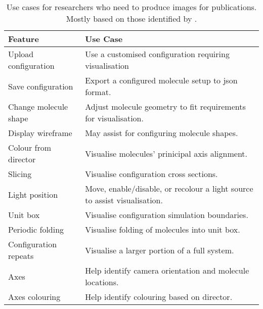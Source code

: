 \begin{table}
  \begin{center}
    \begin{adjustbox}{width=\textwidth}
    \begin{tabular}{ll}
    \hline\hline
       \textbf{Feature} & \textbf{Use Case} \\
       \hline
       Upload configuration & Use a customised configuration requiring visualisation \\
       Save configuration & Export a configured molecule setup to json format. \\
       Change molecule shape & Adjust molecule geometry to fit requirements for visualisation. \\
       Display wireframe & May assist for configuring molecule shapes. \\
       Colour from director & Visualise molecules' prinicipal axis alignment. \\
       Slicing & Visualise configuration cross sections. \\
       Light position & Move, enable/disable, or recolour a light source to assist visualisation.\\
       Unit box & Visualise configuration simulation boundaries. \\
       Periodic folding & Visualise folding of molecules into unit box. \\
       Configuration repeats & Visualise a larger portion of a full system. \\
       Axes & Help identify camera orientation and molecule locations. \\
       Axes colouring & Help identify colouring based on director. \\
       \hline\hline
    \end{tabular}
  \end{adjustbox}
  \end{center}
  \caption{Use cases for researchers who need to produce images for publications. Mostly based on those identified by \textcite{Battistini_2021}.}
  \label{tab:use_cases2}
\end{table}
